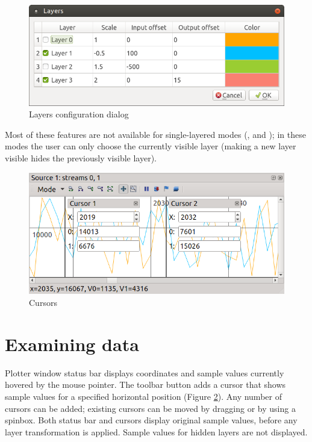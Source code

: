\documentclass[a4paper,12pt,twoside,extrafontsizes]{memoir}
\begin{document}
\begin{figure}[htbp]
\centering
\includegraphics[scale=0.45]{images/plotterlayers.png}
\caption{Layers configuration dialog}
\label{fig:plotterlayers}
\end{figure}

Most of these features are not available for single-layered modes (,  and ); in these modes the user can only choose the currently visible layer (making a new layer visible hides the previously visible layer).

\begin{figure}[htbp]
\centering
\includegraphics{images/plottercursors.png}
\caption{Cursors}
\label{fig:plottercursors}
\end{figure}

\section{Examining data}

Plotter window status bar displays coordinates and sample values currently hovered by the mouse pointer. The  toolbar button adds a cursor that shows sample values for a specified horizontal position (Figure \ref{fig:plottercursors}). Any number of cursors can be added; existing cursors can be moved by dragging or by using a spinbox. Both status bar and cursors display original sample values, before any layer transformation is applied. Sample values for hidden layers are not displayed.
\end{document}
